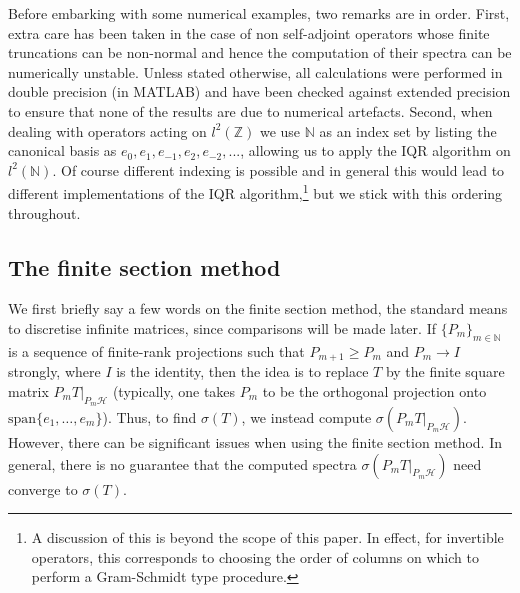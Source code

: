 \documentclass[a4paper,10pt]{article}
\begin{document}
Before embarking with some numerical examples, two remarks are in order. First, extra care has been taken in the case of non self-adjoint operators whose finite truncations can be non-normal and hence the computation of their spectra can be numerically unstable. Unless stated otherwise, all calculations were performed in double precision (in MATLAB) and have been checked against extended precision \cite{mct2015} to ensure that none of the results are due to numerical artefacts. Second, when dealing with operators acting on $l^2(\mathbb{Z})$ we use $\mathbb{N}$ as an index set by listing the canonical basis as $e_0,e_1,e_{-1},e_2,e_{-2},...$, allowing us to apply the IQR algorithm on $l^2(\mathbb{N})$. Of course different indexing is possible and in general this would lead to different implementations of the IQR algorithm,\footnote{A discussion of this is beyond the scope of this paper. In effect, for invertible operators, this corresponds to choosing the order of columns on which to perform a Gram-Schmidt type procedure.} but we stick with this ordering throughout.

\subsection{The finite section method}
\label{s:FS}

We first briefly say a few words on the finite section method, the standard means to discretise infinite matrices, since comparisons will be made later. If
$\{P_m\}_{m \in \mathbb{N}}$ is a sequence of finite-rank projections such that $P_{m+1} \geq P_m$ and $P_m \rightarrow I$ strongly, where $I$ is the identity, then the idea is to replace $T$ by the finite square matrix $P_m T |_{P_m\mathcal{H}}$ (typically, one takes $P_m$ to be the orthogonal projection onto $\mathrm{span} \{e_1,\ldots,e_m \}$). Thus, to find $\sigma(T)$, we instead compute $\sigma(P_m T |_{P_m\mathcal{H}})$. However, there can be significant issues when using the finite section method. In general, there is no guarantee that the computed spectra $\sigma(P_m T |_{P_m\mathcal{H}})$ need converge to $\sigma(T)$.
\end{document}
